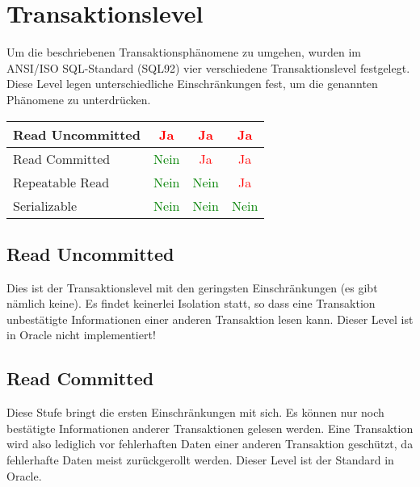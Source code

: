     \section{Transaktionslevel}
      Um die beschriebenen Transaktionsph\"anomene zu umgehen, wurden im ANSI/ISO SQL-Standard (SQL92) vier verschiedene Transaktionslevel festgelegt. Diese Level legen unterschiedliche Einschr\"ankungen fest, um die genannten Ph\"anomene zu unterdr\"ucken.
\clearpage
      \begin{small}
        \begin{supertabular}{|l|c|c|c|}
          Read Uncommitted & \textcolor{red}{Ja} & \textcolor{red}{Ja} & \textcolor{red}{Ja} \\
          \hline
          Read Committed & \textcolor{green}{Nein} & \textcolor{red}{Ja} & \textcolor{red}{Ja} \\
          \hline
          Repeatable Read & \textcolor{green}{Nein} & \textcolor{green}{Nein} & \textcolor{red}{Ja} \\
          \hline
          Serializable & \textcolor{green}{Nein} & \textcolor{green}{Nein} & \textcolor{green}{Nein}  \\
          \hline
        \end{supertabular}
      \end{small}
      \subsection{Read Uncommitted}
        Dies ist der Transaktionslevel mit den geringsten Einschr\"ankungen (es gibt n\"amlich keine). Es findet keinerlei Isolation statt, so dass eine Transaktion unbest\"atigte Informationen einer anderen Transaktion lesen kann. Dieser Level ist in Oracle nicht implementiert!
      \subsection{Read Committed}
        Diese Stufe bringt die ersten Einschr\"ankungen mit sich. Es k\"onnen nur noch best\"atigte Informationen anderer Transaktionen gelesen werden. Eine Transaktion wird also lediglich vor fehlerhaften Daten einer anderen Transaktion gesch\"utzt, da fehlerhafte Daten meist zur\"uckgerollt werden. Dieser Level ist der Standard in Oracle.
